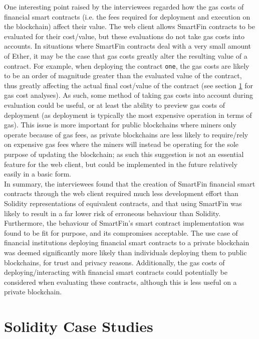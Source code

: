One interesting point raised by the interviewees regarded how the gas costs of financial smart contracts (i.e. the fees required for deployment and execution on the blockchain) affect their value. The web client allows SmartFin contracts to be evaluated for their cost/value, but these evaluations do not take gas costs into accounts. In situations where SmartFin contracts deal with a very small amount of Ether, it may be the case that gas costs greatly alter the resulting value of a contract. For example, when deploying the contract \texttt{one}, the gas costs are likely to be an order of magnitude greater than the evaluated value of the contract, thus greatly affecting the actual final cost/value of the contract (see section \ref{case-studies} for gas cost analyses). As such, some method of taking gas costs into account during evaluation could be useful, or at least the ability to preview gas costs of deployment (as deployment is typically the most expensive operation in terms of gas). This issue is more important for public blockchains where miners only operate because of gas fees, as private blockchains are less likely to require/rely on expensive gas fees where the miners will instead be operating for the sole purpose of updating the blockchain; as such this suggestion is not an essential feature for the web client, but could be implemented in the future relatively easily in a basic form. \\

In summary, the interviewees found that the creation of SmartFin financial smart contracts through the web client required much less development effort than Solidity representations of equivalent contracts, and that using Smart\-Fin was likely to result in a far lower risk of erroneous behaviour than Solidity. Furthermore, the behaviour of SmartFin's smart contract implementation was found to be fit for purpose, and its compromises acceptable. The use case of financial institutions deploying financial smart contracts to a private blockchain was deemed significantly more likely than individuals deploying them to public blockchains, for trust and privacy reasons. Additionally, the gas costs of deploying/interacting with financial smart contracts could potentially be considered when evaluating these contracts, although this is less useful on a private blockchain.


\section{Solidity Case Studies} \label{case-studies}

